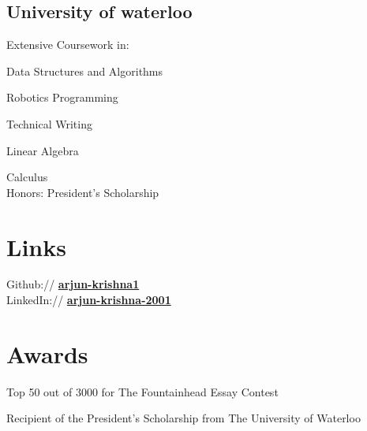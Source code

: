\documentclass[]{deedy-resume-openfont}
\begin{document}
\begin{minipage}[t]{0.33\textwidth}
\subsection{University of waterloo}
\vspace{2mm}
Extensive Coursework in: 
\vspace{3mm}
\begin{tightemize}
\item Data Structures and Algorithms
\item Robotics Programming
\item Technical Writing
\item Linear Algebra 
\item Calculus \\
Honors: President's Scholarship
\end{tightemize}
\sectionsep


\section{Links} 
Github:// \href{https://github.com/arjun-krishna1}{\bf arjun-krishna1} \\
LinkedIn://  \href{https://www.linkedin.com/in/arjun-krishna-2001}{\bf arjun-krishna-2001} \\


\section{Awards} 
\vspace{1mm}
\begin{tightemize}
 \item Top 50 out of 3000 for The Fountainhead Essay Contest
 \item Recipient of the President's Scholarship from The University of Waterloo

\end{tightemize}


%
%

\end{minipage} 
\hfill
\end{document}
